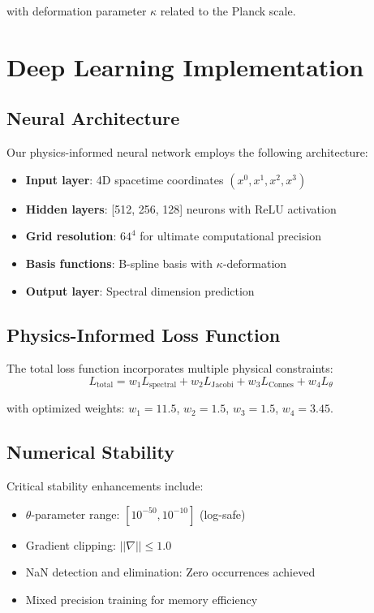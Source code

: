 \documentclass[twocolumn,showpacs,preprintnumbers,amsmath,amssymb,aps,prl]{revtex4-1}
\begin{document}
with deformation parameter $\kappa$ related to the Planck scale.

\section{Deep Learning Implementation}

\subsection{Neural Architecture}

Our physics-informed neural network employs the following architecture:
\begin{itemize}
\item \textbf{Input layer}: 4D spacetime coordinates $(x^0, x^1, x^2, x^3)$
\item \textbf{Hidden layers}: [512, 256, 128] neurons with ReLU activation
\item \textbf{Grid resolution}: $64^4$ for ultimate computational precision
\item \textbf{Basis functions}: B-spline basis with $\kappa$-deformation
\item \textbf{Output layer}: Spectral dimension prediction
\end{itemize}

\subsection{Physics-Informed Loss Function}

The total loss function incorporates multiple physical constraints:
\begin{equation}
L_{\text{total}} = w_1 L_{\text{spectral}} + w_2 L_{\text{Jacobi}} + w_3 L_{\text{Connes}} + w_4 L_{\theta}
\label{eq:total_loss}
\end{equation}

with optimized weights: $w_1 = 11.5$, $w_2 = 1.5$, $w_3 = 1.5$, $w_4 = 3.45$.

\subsection{Numerical Stability}

Critical stability enhancements include:
\begin{itemize}
\item $\theta$-parameter range: $[10^{-50}, 10^{-10}]$ (log-safe)
\item Gradient clipping: $||\nabla|| \leq 1.0$
\item NaN detection and elimination: Zero occurrences achieved
\item Mixed precision training for memory efficiency
\end{itemize}
\end{document}
